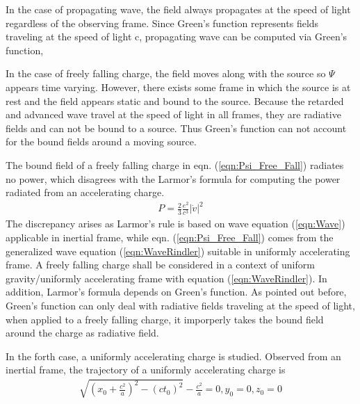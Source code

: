 \documentclass[prd,showpacs,preprint]{revtex4-1}
\begin{document}
In the case of propagating wave, the field always propagates at the speed of light regardless of the observing frame. Since Green's function represents fields traveling at the speed of light c, propagating wave can be computed via Green's function,

In the case of freely falling charge, the field moves along with the source so $\Psi$ appears time varying. However, there exists some frame in which the source is at rest and the field appears static and bound to the source. Because the retarded and advanced wave travel at the speed of light in all frames, they are radiative fields and can not be bound to a source. Thus Green's function can not account for the bound fields around a moving source.

The bound field of a freely falling charge in eqn. (\ref{eqn:Psi_Free_Fall}) radiates no power, which disagrees with the Larmor's formula for computing the power radiated from an accelerating charge. \cite{Jackson}
\begin{eqnarray}
P=\frac{2}{3}\frac{e^2}{c^3}|\dot v|^2
\label{eqn:Larmor}
\end{eqnarray}
The discrepancy arises as Larmor's rule is based on wave equation (\ref{eqn:Wave}) applicable in inertial frame, while eqn. (\ref{eqn:Psi_Free_Fall}) comes from the generalized wave equation (\ref{eqn:WaveRindler}) suitable in uniformly accelerating frame. A freely falling charge shall be considered in a context of uniform gravity/uniformly accelerating frame with equation (\ref{eqn:WaveRindler}). In addition, Larmor's formula depends on Green's function. As pointed out before, Green's function can only deal with radiative fields traveling at the speed of light, when applied to a freely falling charge, it imporperly takes the bound field around the charge as radiative field.

In the forth case, a uniformly accelerating charge is studied. Observed from an inertial frame, the trajectory of a uniformly accelerating charge is
\begin{eqnarray}
\sqrt{(x_0+\frac{c^2}{a})^2-(ct_0)^2}-\frac{c^2}{a}=0,y_0=0,z_0=0
\label{eqn:Trajectory_Accelerating}
\end{eqnarray}
\end{document}
